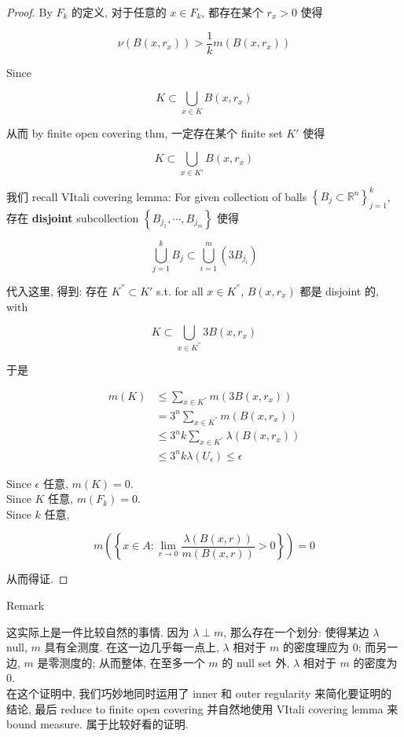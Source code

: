 \documentclass{qlnotes-export}
\begin{document}
\begin{proof}
By \(F_{k}\) 的定义, 对于任意的 \(x \in F_{k}\), 都存在某个 \(r_{x} > 0\) 使得

\[\nu(B(x,r_{x})) > \frac{1}{k}m(B(x,r_{x}))\]

Since

\[K \subset \bigcup\limits_{x \in K}B(x,r_{x})\]

从而 by finite open covering thm, 一定存在某个 finite set \(K'\) 使得

\[K \subset \bigcup\limits_{x \in K'}B(x,r_{x})\]

我们 recall VItali covering lemma: For given collection of balls \(\left\{ {B_{j} \subset {\mathbb{R}}^{n}} \right\}_{j = 1}^{k}\), 存在 \textbf{disjoint} subcollection \(\left\{ {B_{j_{1}},\cdots,B_{j_{m}}} \right\}\) 使得

\[\bigcup\limits_{j = 1}^{k}B_{j} \subset \bigcup\limits_{i = 1}^{m}(3B_{j_{i}})\]

代入这里, 得到: 存在 \(K^{''} \subset K'\) s.t. for all \(x \in K^{''}\), \(B(x,r_{x})\) 都是 disjoint 的, with

\[K \subset \bigcup\limits_{x \in K^{''}}3B(x,r_{x})\]

于是

\[\begin{matrix}
{m(K)} & {\leq \sum\limits_{x \in K^{''}}m(3B(x,r_{x}))} \\
 & {= 3^{n}\sum\limits_{x \in K^{''}}m(B(x,r_{x}))} \\
 & {\leq 3^{n}k\sum\limits_{x \in K^{''}}\lambda(B(x,r_{x}))} \\
 & {\leq 3^{n}k\lambda(U_{\epsilon}) \leq \epsilon}
\end{matrix}\]

Since \(\epsilon\) 任意, \(m(K) = 0\).\\
Since \(K\) 任意, \(m(F_{k}) = 0\).\\
Since \(k\) 任意,

\[m(\left\{ {x \in A:\lim\limits_{r\rightarrow 0}\frac{\lambda(B(x,r))}{m(B(x,r))} > 0} \right\}) = 0\]

从而得证.

\end{proof}

\begin{qlremark}{Remark}

这实际上是一件比较自然的事情. 因为 \(\lambda \perp m\), 那么存在一个划分: 使得某边 \(\lambda\) null, \(m\) 具有全测度. 在这一边几乎每一点上, \(\lambda\) 相对于 \(m\) 的密度理应为 \(0\); 而另一边, \(m\) 是零测度的; 从而整体, 在至多一个 \(m\) 的 null set 外, \(\lambda\) 相对于 \(m\) 的密度为 \(0\).\\
在这个证明中, 我们巧妙地同时运用了 inner 和 outer regularity 来简化要证明的结论, 最后 reduce to finite open covering 并自然地使用 VItali covering lemma 来 bound measure. 属于比较好看的证明.

\end{qlremark}
\end{document}
